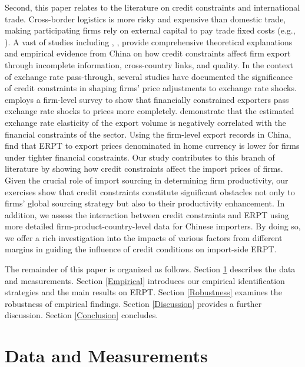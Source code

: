 Second, this paper relates to the literature on credit constraints and international trade. Cross-border logistics is more risky and expensive than domestic trade, making participating firms rely on external capital to pay trade fixed costs (e.g., \citealp{manova2013,chaney2016,kohn2020}). A vast of studies including \cite{feenstra-li-yu2014}, \cite{manova-wei-zhang2015}, \cite{fan-lai-li2015} provide comprehensive theoretical explanations and empirical evidence from China on how credit constraints affect firm export through incomplete information, cross-country links, and quality. In the context of exchange rate pass-through, several studies have documented the significance of credit constraints in shaping firms' price adjustments to exchange rate shocks. \cite{strasser2013} employs a firm-level survey to show that financially constrained exporters pass exchange rate shocks to prices more completely. \cite{xu-guo2021} demonstrate that the estimated exchange rate elasticity of the export volume is negatively correlated with the financial constraints of the sector. Using the firm-level export records in China, \cite{dai2021} find that ERPT to export prices denominated in home currency is lower for firms under tighter financial constraints. Our study contributes to this branch of literature by showing how credit constraints affect the import prices of firms. Given the crucial role of import sourcing in determining firm productivity, our exercises show that credit constraints constitute significant obstacles not only to firms' global sourcing strategy but also to their productivity enhancement. In addition, we assess the interaction between credit constraints and ERPT using more detailed firm-product-country-level data for Chinese importers. By doing so, we offer a rich investigation into the impacts of various factors from different margins in guiding the influence of credit conditions on import-side ERPT. 

The remainder of this paper is organized as follows. Section \ref{Data&Measurements} describes the data and measurements. Section \ref{Empirical} introduces our empirical identification strategies and the main results on ERPT. Section \ref{Robustness} examines the robustness of empirical findings. Section \ref{Discussion} provides a further discussion. Section \ref{Conclusion} concludes.

\section{Data and Measurements} \label{Data&Measurements}


